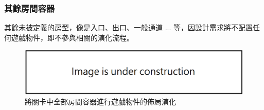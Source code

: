 \subsubsection{其餘房間容器}
\label{sssec:method-segments-appliedonvolumes-others}

其餘未被定義的房型，像是入口、出口、一般通道 ... 等，因設計需求將不配置任何遊戲物件，即不參與相關的演化流程。

\begin{figure}[ht]
  \begin{center}
    \includegraphics[width=1.0\textwidth]{figures/under_construction.png}
    \caption{將關卡中全部房間容器進行遊戲物件的佈局演化} 
    \label{fig:applied-ga-on-volume-all}
  \end{center}
\end{figure}
